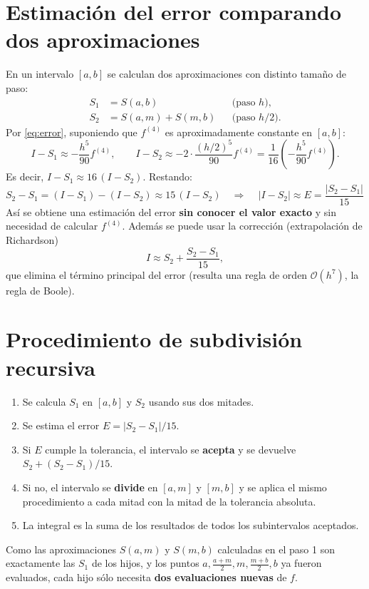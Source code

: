 \documentclass[11pt,letterpaper]{report}
\begin{document}
\section{Estimación del error comparando dos aproximaciones}
En un intervalo $[a,b]$ se calculan dos aproximaciones con distinto tamaño de paso:
\begin{align*}
  S_1 &= S(a,b) && \text{(paso } h\text{)},\\
  S_2 &= S(a,m)+S(m,b) && \text{(paso } h/2\text{)}.
\end{align*}
Por \eqref{eq:error}, suponiendo que $f^{(4)}$ es aproximadamente constante en $[a,b]$:
\[
  I-S_1\approx -\frac{h^5}{90}f^{(4)},\qquad
  I-S_2\approx -2\cdot\frac{(h/2)^5}{90}f^{(4)}=\frac{1}{16}\left(-\frac{h^5}{90}f^{(4)}\right).
\]
Es decir, $I-S_1\approx 16\,(I-S_2)$. Restando:
\[
  S_2-S_1=(I-S_1)-(I-S_2)\approx 15\,(I-S_2)
  \quad\Longrightarrow\quad
  \boxed{\,|I-S_2|\approx E=\frac{|S_2-S_1|}{15}\,}
\]
Así se obtiene una estimación del error \textbf{sin conocer el valor exacto} y sin
necesidad de calcular $f^{(4)}$. Además se puede usar la corrección
(extrapolación de Richardson)
\begin{equation}
  I\approx S_2+\frac{S_2-S_1}{15},
\end{equation}
que elimina el término principal del error (resulta una regla de orden $\mathcal{O}(h^7)$,
la regla de Boole).

\section{Procedimiento de subdivisión recursiva}
\begin{enumerate}
  \item Se calcula $S_1$ en $[a,b]$ y $S_2$ usando sus dos mitades.
  \item Se estima el error $E=|S_2-S_1|/15$.
  \item Si $E$ cumple la tolerancia, el intervalo se \textbf{acepta} y se devuelve
        $S_2+(S_2-S_1)/15$.
  \item Si no, el intervalo se \textbf{divide} en $[a,m]$ y $[m,b]$ y se aplica el
        mismo procedimiento a cada mitad con la mitad de la tolerancia absoluta.
  \item La integral es la suma de los resultados de todos los subintervalos aceptados.
\end{enumerate}
Como las aproximaciones $S(a,m)$ y $S(m,b)$ calculadas en el paso 1 son exactamente
las $S_1$ de los hijos, y los puntos $a,\frac{a+m}{2},m,\frac{m+b}{2},b$ ya fueron
evaluados, cada hijo sólo necesita \textbf{dos evaluaciones nuevas} de $f$.
\end{document}
